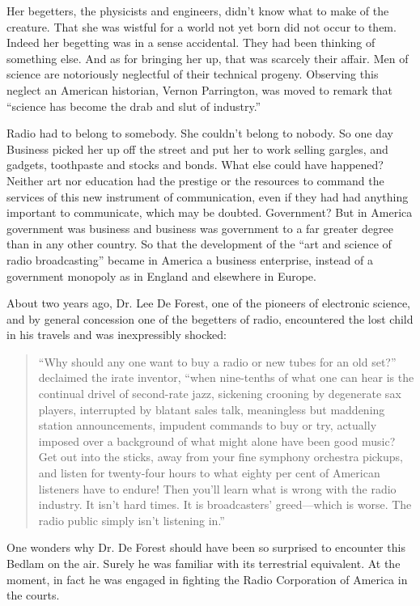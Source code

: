 \documentclass[openany,nobib]{tufte-book}
\begin{document}
Her begetters, the physicists and engineers, didn't know what to make of
the creature. That she was wistful for a world not yet born did not
occur to them. Indeed her begetting was in a sense accidental. They had
been thinking of something else. And as for bringing her up, that was
scarcely their affair. Men of science are notoriously neglectful of
their technical progeny. Observing this neglect an American historian,
Vernon Parrington, was moved to remark that ``science has become the
drab and slut of industry.''

Radio had to belong to somebody. She couldn't belong to nobody. So one
day Business picked her up off the street and put her to work selling
gargles, and gadgets, toothpaste and stocks and bonds. What else could
have happened? Neither art nor education had the prestige or the
resources to command the services of this new instrument of
communication, even if they had had anything important to communicate,
which may be doubted. Government? But in America government was business
and business was government to a far greater degree than in any other
country. So that the development of the ``art and science of radio
broadcasting'' became in America a business enterprise, instead of a
government monopoly as in England and elsewhere in Europe.

About two years ago, Dr. Lee De Forest, one of the pioneers of
electronic science, and by general concession one of the begetters of
radio, encountered the lost child in his travels and was inexpressibly
shocked:

\begin{quote}
``Why should any one want to buy a radio or new tubes for an old set?''
declaimed the irate inventor, ``when nine-tenths of what one can hear is
the continual drivel of second-rate jazz, sickening crooning by
degenerate sax players, interrupted by blatant sales talk, meaningless
but maddening station announcements, impudent commands to buy or try,
actually imposed over a background of what might alone have been good
music? Get out into the sticks, away from your fine symphony orchestra
pickups, and listen for twenty-four hours to what eighty per cent of
American listeners have to endure! Then you'll learn what is wrong with
the radio industry. It isn't hard times. It is broadcasters'
greed---which is worse. The radio public simply isn't listening in.''
\end{quote}

One wonders why Dr. De Forest should have been so surprised to encounter
this Bedlam on the air. Surely he was familiar with its terrestrial
equivalent. At the moment, in fact he was engaged in fighting the Radio
Corporation of America in the courts.
\end{document}
